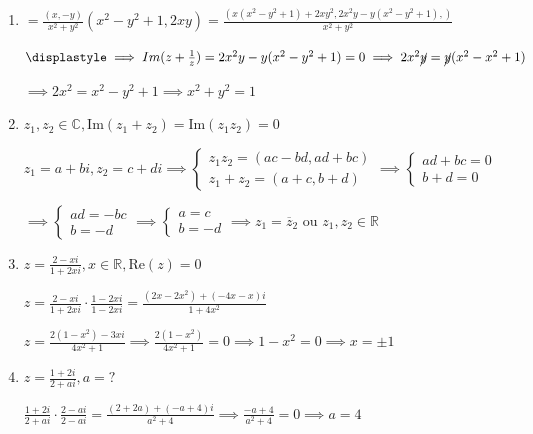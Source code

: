 \documentclass[12pt, openright, a4paper, twoside, english, brazil]{article}
\newenvironment{qitem}{
  \color{black}
\item}{\vspace{10pt}}
\begin{document}
\begin{enumerate}[\bfseries 1.]
\begin{qitem}
    $\displaystyle
    =\frac{(x,-y)}{x^2+y^2}(x^2-y^2+1,2xy)=\frac{(x(x^2-y^2+1)+2xy^2,2x^2y-y(x^2-y^2+1),)}{x^2+y^2}$

    $\displastyle \implies Im(z+\frac1z)=2x^2y-y(x^2-y^2+1)=0\implies
    2x^2\cancel{y}=\cancel{y}(x^2-x^2+1)$

    $\displaystyle \implies 2x^2=x^2-y^2+1\implies x^2+y^2=1$
  \end{qitem}

  \begin{qitem} %
    $\displaystyle z_1,z_2\in\mathbb C, \text{Im}(z_1+z_2)=\text{Im}(z_1z_2)=0$

    \color{red}
    $\displaystyle z_1=a+bi, z_2=c+di \implies
    \begin{cases}z_1z_2=(ac-bd, ad+bc)\\z_1+z_2=(a+c,b+d)
    \end{cases}\implies
    \begin{cases}ad+bc=0\\b+d=0
    \end{cases}$

    $\displaystyle \implies
    \begin{cases}ad=-bc\\b=-d
    \end{cases}\implies
    \begin{cases}a=c\\b=-d
    \end{cases}\implies z_1=\overline z_2$ ou $z_1,z_2\in\mathbb R$
  \end{qitem}

  \begin{qitem} %
    $\displaystyle z=\frac{2-xi}{1+2xi},x\in\mathbb R,\text{Re}(z)=0$

    \color{red}
    $\displaystyle
    z=\frac{2-xi}{1+2xi}\cdot\frac{1-2xi}{1-2xi}=\frac{(2x-2x^2)+(-4x-x)i}{1+4x^2}$

    $\displaystyle z=\frac{2(1-x^2)-3xi}{4x^2+1}\implies
    \frac{2(1-x^2)}{4x^2+1}=0\implies 1-x^2=0\implies x=\pm 1$
  \end{qitem}

  \begin{qitem} %
    $\displaystyle z=\frac{1+2i}{2+ai}, a=?$

    \color{red}
    $\displaystyle
    \frac{1+2i}{2+ai}\cdot\frac{2-ai}{2-ai}=\frac{(2+2a)+(-a+4)i}{a^2+4}\implies
    \frac{-a+4}{a^2+4}=0\implies a=4$
  \end{qitem}


\end{enumerate}
\end{document}
